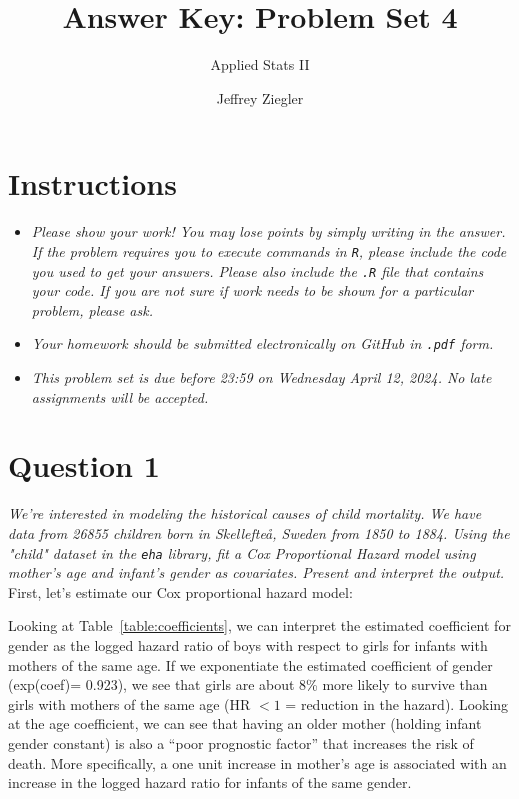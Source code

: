 \documentclass[12pt,letterpaper]{article}
\title{Answer Key: Problem Set 4}
\date{Jeffrey Ziegler}
\author{Applied Stats II}
\begin{document}
	\maketitle
	
	\section*{Instructions}
	\begin{itemize}
		\item \textit{Please show your work! You may lose points by simply writing in the answer. If the problem requires you to execute commands in \texttt{R}, please include the code you used to get your answers. Please also include the \texttt{.R} file that contains your code. If you are not sure if work needs to be shown for a particular problem, please ask.}
			\item \textit{Your homework should be submitted electronically on GitHub in \texttt{.pdf} form.}
			\item \textit{This problem set is due before 23:59 on Wednesday April 12, 2024. No late assignments will be accepted.}
	\end{itemize}
	\vspace{.25cm}
	
	\section*{Question 1}
	\vspace{.25cm}
	\noindent \emph{We're interested in modeling the historical causes of child mortality. We have data from 26855 children born in Skellefteå, Sweden from 1850 to 1884. Using the "child" dataset in the \texttt{eha} library, fit a Cox Proportional Hazard model using mother's age and infant's gender as covariates. Present and interpret the output.}\\
	
	First, let's estimate our Cox proportional hazard model:
	\vspace{.25cm}
	 
	\vspace{.25cm}
	\noindent Looking at Table~\ref{table:coefficients}, we can interpret the estimated coefficient for gender as the logged hazard ratio of boys with respect to girls for infants with mothers of the same age. If we exponentiate the estimated coefficient of gender (exp(coef)= 0.923), we see that girls are about 8\% more likely to survive than girls with mothers of the same age (HR $< 1$ = reduction in the hazard). Looking at the age coefficient, we can see that having an older mother (holding infant gender constant) is also a “poor prognostic factor” that increases the risk of death. More specifically, a one unit increase in mother's age is associated with an increase in the logged hazard ratio for infants of the same gender.
	
\end{document}

